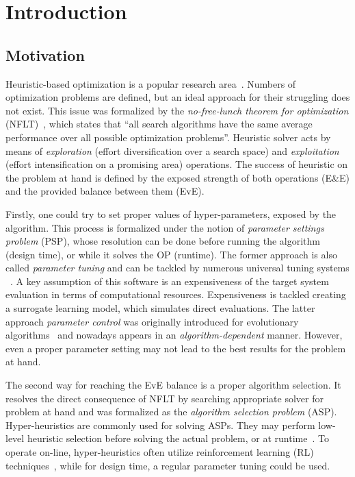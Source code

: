 \chapter{Introduction}\label{intro}

\section{Motivation}
Heuristic-based optimization is a popular research area~\cite{junger2003combinatorial,biegler2004retrospective,festa2014brief}. Numbers of optimization problems are defined, but an ideal approach for their struggling does not exist. This issue was formalized by the \emph{no-free-lunch theorem for optimization} (NFLT)~\cite{wolpert1997no}, which states that ``all search algorithms have the same average performance over all possible optimization problems''. Heuristic solver acts by means of \emph{exploration} (effort diversification over a search space) and \emph{exploitation} (effort intensification on a promising area) operations. The success of heuristic on the problem at hand is defined by the exposed strength of both operations (E\&E) and the provided balance between them (EvE).

Firstly, one could try to set proper values of hyper-parameters, exposed by the algorithm. This process is formalized under the notion of \emph{parameter settings problem} (PSP), whose resolution can be done before running the algorithm (design time), or while it solves the OP (runtime). The former approach is also called \emph{parameter tuning} and can be tackled by numerous universal tuning systems ~\cite{hutter2009paramils,hutter2011sequential,lopez2016irace,falkner2018bohb,brise2spl}. A key assumption of this software is an expensiveness of the target system evaluation in terms of computational resources. Expensiveness is tackled creating a surrogate learning model, which simulates direct evaluations. The latter approach \emph{parameter control} was originally introduced for evolutionary algorithms~\cite{karafotias2014parameter} and nowadays appears in an \emph{algorithm-dependent} manner. However, even a proper parameter setting may not lead to the best results for the problem at hand. 

The second way for reaching the EvE balance is a proper algorithm selection. It resolves the direct consequence of NFLT by searching appropriate solver for problem at hand and was formalized as the \emph{algorithm selection problem} (ASP). Hyper-heuristics are commonly used for solving ASPs. They may perform low-level heuristic selection before solving the actual problem, or at runtime~\cite{burke2019classification}. To operate on-line, hyper-heuristics often utilize reinforcement learning (RL) techniques~\cite{moriarty1999evolutionary,mcclymont2011markov}, while for design time, a regular parameter tuning could be used.

